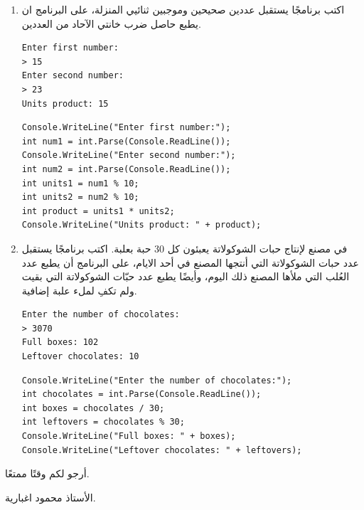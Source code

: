 \documentclass[14pt]{extarticle}
\begin{document}
\begin{enumerate}[itemsep=2cm]
\item
اكتب برنامجًا يستقبل عددين صحيحين وموجبين ثنائيي المنزلة، على البرنامج ان يطبع حاصل ضرب خانتي الآحاد من العددين.
{\small
\ifdetailed
\begin{boxExample}
\begin{english}
\begin{verbatim}
Enter first number:
> 15
Enter second number:
> 23
Units product: 15
\end{verbatim}
\end{english}
\end{boxExample}
\fi
\ifwithsols
\begin{boxSolution}
\begin{english}
\begin{verbatim}
Console.WriteLine("Enter first number:");
int num1 = int.Parse(Console.ReadLine());
Console.WriteLine("Enter second number:");
int num2 = int.Parse(Console.ReadLine());
int units1 = num1 % 10;
int units2 = num2 % 10;
int product = units1 * units2;
Console.WriteLine("Units product: " + product);
\end{verbatim}
\end{english}
\end{boxSolution}
\clearpage
\fi
}

\item
في مصنع لإنتاج حبات الشوكولاتة يعبئون كل 30 حبة بعلبة. اكتب برنامجًا يستقبل عدد حبات الشوكولاتة التي أنتجها المصنع في أحد الايام، على البرنامج أن يطبع عدد العُلب التي ملأها المصنع ذلك اليوم، وأيضًا يطبع عدد حبّات الشوكولاتة التي بقيت ولم تكفِ لملء علبة إضافية.
{\small
\ifdetailed
\begin{boxExample}
\begin{english}
\begin{verbatim}
Enter the number of chocolates:
> 3070
Full boxes: 102
Leftover chocolates: 10
\end{verbatim}
\end{english}
\end{boxExample}
\fi
\ifwithsols
\begin{boxSolution}
\begin{english}
\begin{verbatim}
Console.WriteLine("Enter the number of chocolates:");
int chocolates = int.Parse(Console.ReadLine());
int boxes = chocolates / 30;
int leftovers = chocolates % 30;
Console.WriteLine("Full boxes: " + boxes);
Console.WriteLine("Leftover chocolates: " + leftovers);
\end{verbatim}
\end{english}
\end{boxSolution}
\fi
}



\end{enumerate}

\vspace{3cm}
\begin{flushleft}
أرجو لكم وقتًا ممتعًا.

الأستاذ محمود اغبارية.
\end{flushleft}
\end{document}
